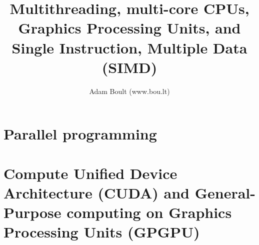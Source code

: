 \documentclass[oneside]{book}
\begin{document}
\author{Adam Boult (www.bou.lt)}
\title{Multithreading, multi-core CPUs,  Graphics Processing Units, and Single Instruction, Multiple Data (SIMD)}
\maketitle

\setcounter{tocdepth}{0}
\tableofcontents



\part{Parallel programming}


\part{Compute Unified Device Architecture (CUDA) and General-Purpose computing on Graphics Processing Units (GPGPU)}
\end{document}

